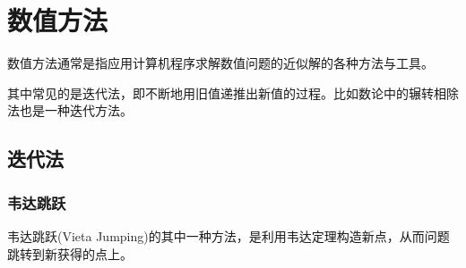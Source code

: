
\chapter{数值方法}
\label{chap:numerical-method}

数值方法通常是指应用计算机程序求解数值问题的近似解的各种方法与工具。

其中常见的是迭代法，即不断地用旧值递推出新值的过程。比如数论中的辗转相除法也是一种迭代方法。

\section{迭代法}
\label{sec:iteration-method}

\subsection{韦达跳跃}
\label{sec:vieta-jumping}

韦达跳跃(Vieta Jumping)的其中一种方法，是利用韦达定理构造新点，从而问题跳转到新获得的点上。

